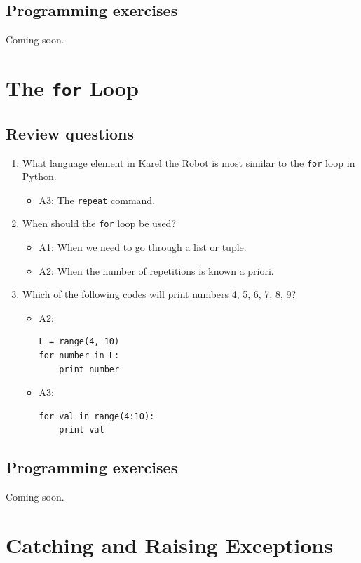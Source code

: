 \documentclass[article,A4,12pt]{llncs}
\begin{document}
\subsection{Programming exercises}

Coming soon.


\section{The {\tt for} Loop} 

\subsection{Review questions}

\begin{enumerate}
\item What language element in Karel the Robot is most similar to the {\tt for} loop in Python.
  \begin{itemize}
    \item A3: The {\tt repeat} command.
  \end{itemize}
\item When should the {\tt for} loop be used?
  \begin{itemize}
    \item A1: When we need to go through a list or tuple.
    \item A2: When the number of repetitions is known a priori. 
  \end{itemize}
\item Which of the following codes will print numbers 4, 5, 6, 7, 8, 9?
  \begin{itemize}
    \item A2:
\begin{verbatim}
L = range(4, 10)
for number in L:
    print number
\end{verbatim}
    \item A3:
\begin{verbatim}
for val in range(4:10):
    print val
\end{verbatim}
  \end{itemize}
\end{enumerate}

\subsection{Programming exercises}

Coming soon.


\section{Catching and Raising Exceptions}
\end{document}
